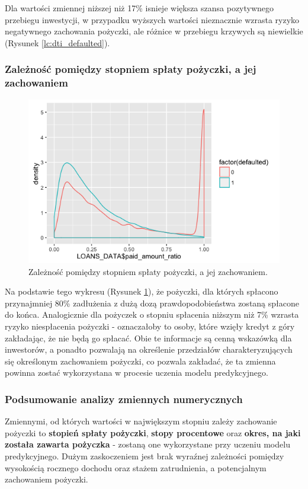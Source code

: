 Dla wartości zmiennej niższej niż 17\% isnieje większa szansa pozytywnego przebiegu inwestycji, w przypadku wyższych wartości nieznacznie wzrasta ryzyko negatywnego zachowania pożyczki, ale różnice w przebiegu krzywych są niewielkie (Rysunek \ref{lc:dti_defaulted}).

\subsubsection{Zależność pomiędzy stopniem spłaty pożyczki, a jej zachowaniem}

\begin{figure}[H] \centering %
	\includegraphics[scale=0.7]{img/paid_defaulted.png}
	\caption{Zależność pomiędzy stopniem spłaty pożyczki, a jej zachowaniem.}
	\label{lc:paid_defaulted}
\end{figure}

Na podstawie tego wykresu (Rysunek \ref{lc:paid_defaulted}), że pożyczki, dla których spłacono przynajmniej 80\% zadłużenia z dużą dozą prawdopodobieństwa zostaną spłacone do końca. Analogicznie dla pożyczek o stopniu spłacenia niższym niż 7\% wzrasta ryzyko niespłacenia pożyczki - oznaczałoby to osoby, które wzięły kredyt z góry zakładając, że nie będą go spłacać. Obie te informacje są cenną wskazówką dla inwestorów, a ponadto pozwalają na określenie przedziałów charakteryzujących się określonym zachowaniem pożyczki, co pozwala zakładać, że ta zmienna powinna zostać wykorzystana w procesie uczenia modelu predykcyjnego.

\subsubsection{Podsumowanie analizy zmiennych numerycznych}

Zmiennymi, od których wartości w największym stopniu zależy zachowanie pożyczki to \textbf{stopień spłaty pożyczki}, \textbf{stopy procentowe} oraz \textbf{okres, na jaki została zawarta pożyczka} - zostaną one wykorzystane przy uczeniu modelu predykcyjnego. Dużym zaskoczeniem jest brak wyraźnej zależności pomiędzy wysokością rocznego dochodu oraz stażem zatrudnienia, a potencjalnym zachowaniem pożyczki.
